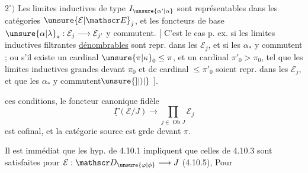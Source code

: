 $2^\circ)$ Les limites inductives de type $I_{\unsure{\alpha'|\alpha}}$ sont représentables dans les catégories $\unsure{\mathcal E|\mathscr E}_j$, et les foncteurs  de base $\unsure{\alpha|\lambda}_*:\mathcal E_j\longrightarrow\mathcal E_{j'}$ y commutent.
[ C'est le cas p. ex. si les limites inductives filtrantes \uline{dénombrables} sont repr. dans les $\mathcal E_j$, et si les $\alpha_*$ y commutent ; ou s'il existe un cardinal $\unsure{\pi|\kappa}_0\leq\pi$, et un cardinal $\pi'_0>\pi_0$, tel que les limites inductives grandes devant $\pi_0$ et de cardinal $\leq\pi'_0$ soient repr. dans les $\mathcal E_j$, et que les $\alpha_*$ y commutent$\unsure{]|)|{}}$ ].

\margin{$\unsure{]\!]|]|\parallel}$} ces conditions, le foncteur canonique fidèle
\[
 \underline{\Gamma}(\mathcal E/J)\longrightarrow\prod_{j\in\operatorname{Ob}J}\mathcal E_j \tag*{(4.10.3.1)}
\]
est cofinal, et la catégorie source est grde devant $\pi$.

Il est \inserted{$\pm$} immédiat que les hyp. de 4.10.1 impliquent que celles de 4.10.3 sont satisfaites pour $\mathcal E:\mathscr D_{\unsure{\varphi|\phi}}\longrightarrow J$ (4.10.5), Pour
